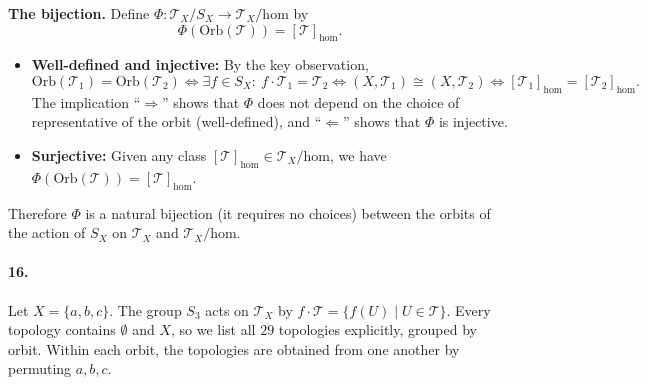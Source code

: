 \documentclass[12pt]{article}
\begin{document}
\textbf{The bijection.} Define $\Phi: \mathcal{T}_X / S_X \to \mathcal{T}_X/\text{hom}$ by
\[
\Phi(\text{Orb}(\mathcal{T})) = [\mathcal{T}]_{\text{hom}}.
\]
\begin{itemize}
    \item \textbf{Well-defined and injective:} By the key observation,
    \[
    \text{Orb}(\mathcal{T}_1) = \text{Orb}(\mathcal{T}_2) \iff \exists f\in S_X:\ f\cdot\mathcal{T}_1=\mathcal{T}_2 \iff (X,\mathcal{T}_1)\cong(X,\mathcal{T}_2) \iff [\mathcal{T}_1]_{\text{hom}} = [\mathcal{T}_2]_{\text{hom}}.
    \]
    The implication ``$\Rightarrow$'' shows that $\Phi$ does not depend on the choice of representative of the orbit (well-defined), and ``$\Leftarrow$'' shows that $\Phi$ is injective.
    \item \textbf{Surjective:} Given any class $[\mathcal{T}]_{\text{hom}} \in \mathcal{T}_X/\text{hom}$, we have $\Phi(\text{Orb}(\mathcal{T})) = [\mathcal{T}]_{\text{hom}}$.
\end{itemize}
Therefore $\Phi$ is a natural bijection (it requires no choices) between the orbits of the action of $S_X$ on $\mathcal{T}_X$ and $\mathcal{T}_X/\text{hom}$.

\paragraph{16.} Let $X = \{a, b, c\}$. The group $S_3$ acts on $\mathcal{T}_X$ by $f\cdot\mathcal{T}=\{f(U)\mid U\in\mathcal{T}\}$. Every topology contains $\emptyset$ and $X$, so we list all $29$ topologies explicitly, grouped by orbit. Within each orbit, the topologies are obtained from one another by permuting $a,b,c$.
\end{document}
